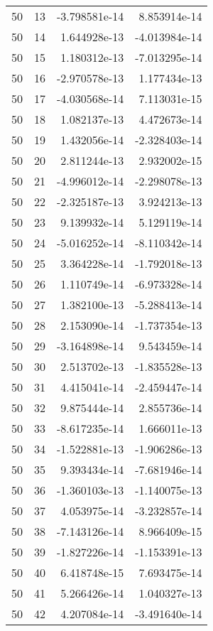 \begin{tabular}{rrrr}
  50 &   13 & -3.798581e-14 &  8.853914e-14 \\
  50 &   14 &  1.644928e-13 & -4.013984e-14 \\
  50 &   15 &  1.180312e-13 & -7.013295e-14 \\
  50 &   16 & -2.970578e-13 &  1.177434e-13 \\
  50 &   17 & -4.030568e-14 &  7.113031e-15 \\
  50 &   18 &  1.082137e-13 &  4.472673e-14 \\
  50 &   19 &  1.432056e-14 & -2.328403e-14 \\
  50 &   20 &  2.811244e-13 &  2.932002e-15 \\
  50 &   21 & -4.996012e-14 & -2.298078e-13 \\
  50 &   22 & -2.325187e-13 &  3.924213e-13 \\
  50 &   23 &  9.139932e-14 &  5.129119e-14 \\
  50 &   24 & -5.016252e-14 & -8.110342e-14 \\
  50 &   25 &  3.364228e-14 & -1.792018e-13 \\
  50 &   26 &  1.110749e-14 & -6.973328e-14 \\
  50 &   27 &  1.382100e-13 & -5.288413e-14 \\
  50 &   28 &  2.153090e-14 & -1.737354e-13 \\
  50 &   29 & -3.164898e-14 &  9.543459e-14 \\
  50 &   30 &  2.513702e-13 & -1.835528e-13 \\
  50 &   31 &  4.415041e-14 & -2.459447e-14 \\
  50 &   32 &  9.875444e-14 &  2.855736e-14 \\
  50 &   33 & -8.617235e-14 &  1.666011e-13 \\
  50 &   34 & -1.522881e-13 & -1.906286e-13 \\
  50 &   35 &  9.393434e-14 & -7.681946e-14 \\
  50 &   36 & -1.360103e-13 & -1.140075e-13 \\
  50 &   37 &  4.053975e-14 & -3.232857e-14 \\
  50 &   38 & -7.143126e-14 &  8.966409e-15 \\
  50 &   39 & -1.827226e-14 & -1.153391e-13 \\
  50 &   40 &  6.418748e-15 &  7.693475e-14 \\
  50 &   41 &  5.266426e-14 &  1.040327e-13 \\
  50 &   42 &  4.207084e-14 & -3.491640e-14 \\

\end{tabular}
